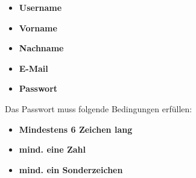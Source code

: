\begin{figure}[H]
\begin{minipage}{.6\textwidth}
\begin{changemargin}{0.5cm}{0cm}
            \begin{itemize}
                \item \textbf{Username}
                \item \textbf{Vorname}
                \item \textbf{Nachname}
                \item \textbf{E-Mail}
                \item \textbf{Passwort}
            \end{itemize}

            Das Passwort muss folgende Bedingungen erfüllen:
            \begin{itemize}
                \item \textbf{Mindestens 6 Zeichen lang}
                \item \textbf{mind. eine Zahl}
                \item \textbf{mind. ein Sonderzeichen}
            \end{itemize}
        \end{changemargin}
    \end{minipage}
\end{figure}


